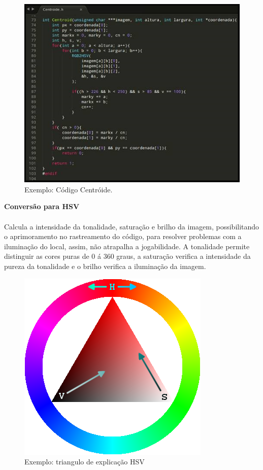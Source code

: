 \documentclass{sciposter}
\begin{document}
\begin{multicols}{3}
\begin{figure}[!htb]
\centering
\includegraphics[scale=1.7]{centroid.png}
\caption{Exemplo: Código Centróide.}
\end{figure}

\textbf{Conversão para HSV} \\ \\
Calcula a intensidade da tonalidade, saturação e brilho da imagem, possibilitando o aprimoramento no rastreamento do código, para resolver problemas com a iluminação do local, assim, não atrapalha a jogabilidade. A tonalidade permite distinguir as cores puras de 0 á 360 graus, a saturação verifica a intensidade da pureza da tonalidade e o brilho verifica a iluminação da imagem.

\begin{figure}[!htb]
\centering
\includegraphics[scale=0.7]{Triangulo_HSV.png}
\caption{Exemplo: triangulo de explicação HSV }
\end{figure}


\end{multicols}
\end{document}
